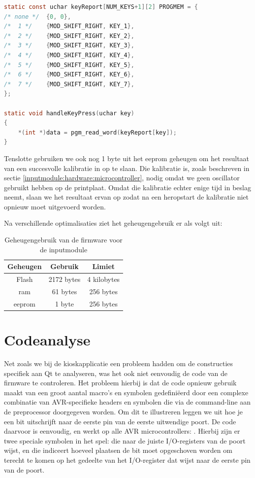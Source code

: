 \begin{lstlisting}[language=C, float, caption=Optimalisatie van de lookup-table.]
static const uchar keyReport[NUM_KEYS+1][2] PROGMEM = {
/* none */  {0, 0},
/*  1 */    {MOD_SHIFT_RIGHT, KEY_1},
/*  2 */    {MOD_SHIFT_RIGHT, KEY_2},
/*  3 */    {MOD_SHIFT_RIGHT, KEY_3},
/*  4 */    {MOD_SHIFT_RIGHT, KEY_4},
/*  5 */    {MOD_SHIFT_RIGHT, KEY_5},
/*  6 */    {MOD_SHIFT_RIGHT, KEY_6},
/*  7 */    {MOD_SHIFT_RIGHT, KEY_7},
};

static void handleKeyPress(uchar key)
{
    *(int *)data = pgm_read_word(keyReport[key]);
}
\end{lstlisting}

Tenslotte gebruiken we ook nog 1 byte uit het \ac{eeprom} geheugen om het resultaat van een succesvolle kalibratie in op te slaan. Die kalibratie is, zoals beschreven in sectie \ref{inputmodule:hardware:microcontroller}, nodig omdat we geen oscillator gebruikt hebben op de printplaat. Omdat die kalibratie echter enige tijd in beslag neemt, slaan we het resultaat ervan op zodat na een heropstart de kalibratie niet opnieuw moet uitgevoerd worden.

Na verschillende optimalisaties ziet het geheugengebruik er als volgt uit:
\begin{table}[h!]
  \begin{center}
    \begin{tabular}{c c c}
    Geheugen & Gebruik & Limiet \\
    \hline
    Flash & 2172 bytes & 4 kilobytes \\
    \ac{ram} & 61 bytes & 256 bytes \\
    \ac{eeprom} & 1 byte & 256 bytes \\
    \end{tabular}
  \end{center}
  \caption{Geheugengebruik van de firmware voor de inputmodule}
\end{table}

\section{Codeanalyse}
\label{inputmodule:firmware:codenalyse}

Net zoals we bij de kioskapplicatie een probleem hadden om de constructies specifiek aan Qt te analyseren, was het ook niet eenvoudig de code van de firmware te controleren. Het probleem hierbij is dat de code opnieuw gebruik maakt van een groot aantal macro's en symbolen gedefiniëerd door een complexe combinatie van AVR-specifieke headers en symbolen die via de command-line aan de preprocessor doorgegeven worden. Om dit te illustreren leggen we uit hoe je een bit uitschrijft naar de eerste pin van de eerste uitwendige poort. De code daarvoor is eenvoudig, en werkt op alle AVR microcontrollers: . Hierbij zijn er twee speciale symbolen in het spel:  die naar de juiste I/O-registers van de poort wijst, en  die indiceert hoeveel plaatsen de bit moet opgeschoven worden om terecht te komen op het gedeelte van het I/O-register dat wijst naar de eerste pin van de poort.

